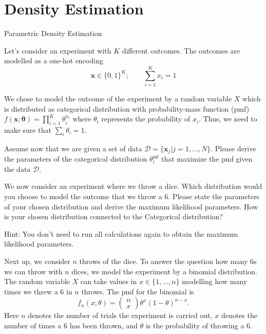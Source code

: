 \documentclass[
	ngerman,
	points=true,%
    solution=true,
    accentcolor=9c,
    colorbacktitle
	]{tudaexercise}
\begin{document}
\section*{Density Estimation}
\begin{task}{Parametric Density Estimation}
        \begin{subtask}
        Let's consider an experiment with $K$ different outcomes. The outcomes are modelled as a one-hot encoding
        $$\boldsymbol{x}\in\{0, 1\}^K; \qquad \sum_{i=1}^{K} x_i = 1$$
%

        We chose to model the outcome of the experiment by a random variable $X$ which is distributed as categorical distribution with probability-mass function (pmf) $f(\boldsymbol{x};\boldsymbol{\theta}) = \prod_{i=1}^{K}\theta_i^{x_i}$ where $\theta_i$ represents the probability of $x_i$. Thus, we need to make sure that $\sum_i \theta_i = 1$.
        
        Assume now that we are given a set of data $\mathcal{D} = \{\boldsymbol{x}_j|j=1,\dots,N\}$. Please derive the parameters of the categorical distribution $\theta_i^{\mathrm{ml}}$ that maximize the pmf given the data $\mathcal{D}$.\\
    \end{subtask}
    \begin{solution}
    
    \end{solution}
    \begin{subtask}
        We now consider an experiment where we throw a dice. Which distribution would you choose to model the outcome that we throw a 6. Please state the parameters of your chosen distribution and derive the maximum likelihood parameters. How is your chosen distribution connected to the Categorical distribution?

        Hint: You don't need to run all calculations again to obtain the maximum likelihood parameters.
    \end{subtask}
    \begin{solution}
    
    \end{solution}
    \begin{subtask}\label{subtask:binomial_ml}
        Next up, we consider $n$ throws of the dice. To answer the question how many 6s we can throw with $n$ dices, we model the experiment by a binomial distribution. The random variable $X$ can take values in $x\in\{1,\dots, n\}$ modelling how many times we threw a 6 in $n$ throws. The pmf for the binomial is
        $$f_n(x;\theta) = \begin{pmatrix}
            n\\x
        \end{pmatrix} \theta^{x} (1-\theta)^{n-x}.$$
        Here $n$ denotes the number of trials the experiment is carried out, $x$ denotes the number of times a 6 has been thrown, and $\theta$ is the probability of throwing a 6.
        

\end{subtask}
\end{task}
\end{document}
